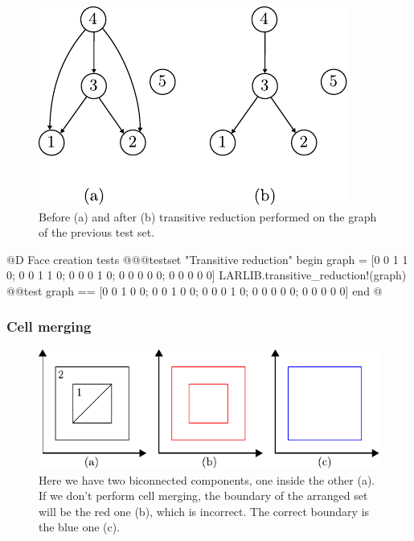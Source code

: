 \begin{figure}[h]
    \centering
    \includegraphics{./img/ch2-transitivered.pdf}
    \caption{Before (a) and after (b) transitive reduction performed on
    the graph of the previous test set.}
\end{figure}

@D Face creation tests
@{@@testset "Transitive reduction" begin
    graph = [0 0 1 1 0; 0 0 1 1 0; 0 0 0 1 0; 0 0 0 0 0; 0 0 0 0 0]
    LARLIB.transitive_reduction!(graph)
    @@test graph == [0 0 1 0 0; 0 0 1 0 0; 0 0 0 1 0; 0 0 0 0 0; 0 0 0 0 0]
end
@}

\subsubsection{Cell merging}

\begin{figure}[h]
    \centering
    \includegraphics{./img/ch2-cellmerge.pdf}
    \caption{Here we have two biconnected components, one inside the other (a).
    If we don't perform cell merging, the boundary of the arranged set will be
    the red one (b), which is incorrect. The correct boundary is the blue one (c).}
\end{figure}

